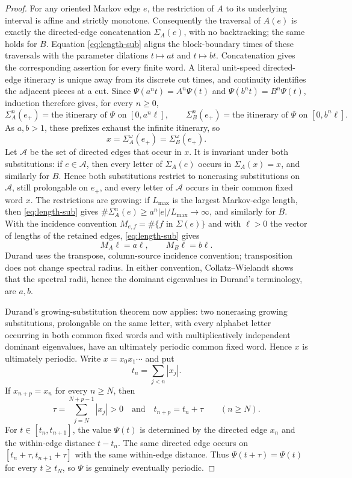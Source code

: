 \documentclass[11pt]{article}
\begin{document}
\begin{proof}
For any oriented Markov edge $e$, the restriction of $A$ to its underlying interval is affine and
strictly monotone. Consequently the traversal of $A(e)$ is exactly the directed-edge concatenation
$\Sigma_A(e)$, with no backtracking; the same holds for $B$. Equation \eqref{eq:length-sub} aligns
the block-boundary times of these traversals with the parameter dilations $t\mapsto at$ and
$t\mapsto bt$. Concatenation gives the corresponding assertion for every finite word. A literal
unit-speed directed-edge itinerary is unique away from its discrete cut times, and continuity identifies
the adjacent pieces at a cut. Since
$\Psi(a^nt)=A^n\Psi(t)$ and $\Psi(b^nt)=B^n\Psi(t)$, induction therefore gives, for every $n\ge0$,
\[
\Sigma_A^n(e_+)=\text{the itinerary of $\Psi$ on }[0,a^n\ell],\qquad
\Sigma_B^n(e_+)=\text{the itinerary of $\Psi$ on }[0,b^n\ell].
\]
As $a,b>1$, these prefixes exhaust the infinite itinerary, so
\[
x=\Sigma_A^\omega(e_+)=\Sigma_B^\omega(e_+).
\]
Let $\mathcal A$ be the set of directed edges that occur in $x$. It is invariant under both substitutions:
if $e\in\mathcal A$, then every letter of $\Sigma_A(e)$ occurs in
$\Sigma_A(x)=x$, and similarly for $B$. Hence both substitutions restrict to nonerasing substitutions on
$\mathcal A$, still prolongable on $e_+$, and every letter of $\mathcal A$ occurs in their common fixed
word $x$. The restrictions are growing: if $L_{\max}$ is the largest Markov-edge length, then
\eqref{eq:length-sub} gives
$\#\Sigma_A^n(e)\ge a^n|e|/L_{\max}\to\infty$, and similarly for $B$. With the incidence convention
$M_{e,f}=\#\{f\text{ in }\Sigma(e)\}$ and with $\boldsymbol\ell>0$ the vector of lengths of the
retained edges, \eqref{eq:length-sub} gives
\[
M_A\boldsymbol\ell=a\boldsymbol\ell,\qquad
M_B\boldsymbol\ell=b\boldsymbol\ell.
\]
Durand uses the transpose, column-source incidence convention; transposition does not change spectral
radius. In either convention, Collatz--Wielandt shows that the spectral radii, hence the dominant
eigenvalues in Durand's terminology, are $a,b$.

Durand's growing-substitution theorem \cite[Theorem~9]{Durand} now applies: two nonerasing growing
substitutions, prolongable on the same letter, with every alphabet letter occurring in both common fixed
words and with multiplicatively independent dominant eigenvalues, have an ultimately periodic common
fixed word. Hence $x$ is ultimately periodic. Write $x=x_0x_1\cdots$ and put
\[
t_n=\sum_{j<n}|x_j|.
\]
If $x_{n+p}=x_n$ for every $n\geq N$, then
\[
\tau=\sum_{j=N}^{N+p-1}|x_j|>0
\quad\text{and}\quad
t_{n+p}=t_n+\tau\qquad(n\geq N).
\]
For $t\in[t_n,t_{n+1}]$, the value $\Psi(t)$ is determined by the directed edge $x_n$ and the
within-edge distance $t-t_n$. The same directed edge occurs on
$[t_n+\tau,t_{n+1}+\tau]$ with the same within-edge distance. Thus
$\Psi(t+\tau)=\Psi(t)$ for every $t\geq t_N$, so $\Psi$ is genuinely eventually periodic.
\end{proof}
\end{document}
